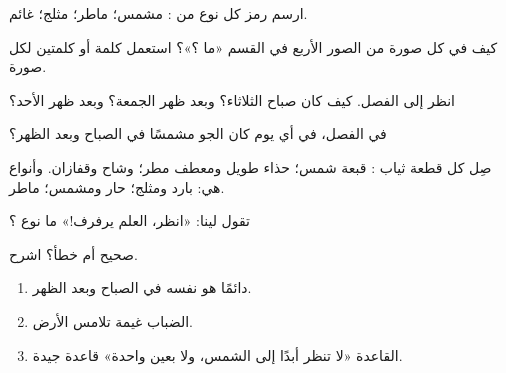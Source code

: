 \begin{exercise}[$\star$]\label{exo:g1:watching-the-weather:1}
ارسم رمز كل نوع من : مشمس؛ ماطر؛ مثلج؛ غائم.
\end{exercise}

\begin{exercise}[$\star$]\label{exo:g1:watching-the-weather:2}
كيف  في كل صورة من الصور الأربع في القسم «ما ؟»؟ استعمل
كلمة أو كلمتين لكل صورة.
\end{exercise}

\begin{exercise}[$\star$]\label{exo:g1:watching-the-weather:3}
انظر إلى  الفصل. كيف كان  صباح الثلاثاء؟ وبعد ظهر
الجمعة؟ وبعد ظهر الأحد؟
\end{exercise}

\begin{exercise}[$\star$]\label{exo:g1:watching-the-weather:4}
في  الفصل، في أي يوم كان الجو مشمسًا في الصباح وبعد
الظهر؟
\end{exercise}

\begin{exercise}[$\star$]\label{exo:g1:watching-the-weather:5}
صِل كل قطعة ثياب : قبعة شمس؛ حذاء طويل ومعطف مطر؛ وشاح
وقفازان. وأنواع  هي: بارد ومثلج؛ حار ومشمس؛
ماطر.
\end{exercise}

\begin{exercise}[$\star$]\label{exo:g1:watching-the-weather:6}
تقول لينا: «انظر، العلم يرفرف!» ما نوع ؟
\end{exercise}

\begin{exercise}[$\star$]\label{exo:g1:watching-the-weather:7}
صحيح أم خطأ؟ اشرح.
\begin{enumerate}
  \item {} دائمًا هو نفسه في الصباح وبعد الظهر.
  \item الضباب غيمة تلامس الأرض.
  \item القاعدة «لا تنظر أبدًا إلى الشمس، ولا بعين واحدة» قاعدة جيدة.
\end{enumerate}
\end{exercise}

